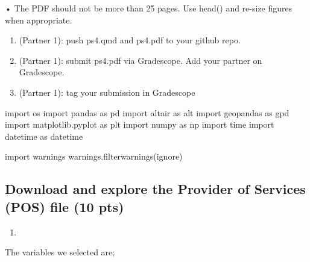 \documentclass[
  letterpaper,
  DIV=11,
  numbers=noendperiod]{scrartcl}
\newenvironment{Shaded}{\begin{snugshade}}{\end{snugshade}}
\newcommand{\ImportTok}[1]{\textcolor[rgb]{0.00,0.46,0.62}{#1}}
\newcommand{\NormalTok}[1]{\textcolor[rgb]{0.00,0.23,0.31}{#1}}
\newcommand{\StringTok}[1]{\textcolor[rgb]{0.13,0.47,0.30}{#1}}
\providecommand{\tightlist}{%
  \setlength{\itemsep}{0pt}\setlength{\parskip}{0pt}}\usepackage{longtable,booktabs,array}
\begin{document}
• The PDF should not be more than 25 pages. Use head() and re-size
figures when appropriate.

\begin{enumerate}
\def\labelenumi{\arabic{enumi}.}
\setcounter{enumi}{7}
\item
  (Partner 1): push ps4.qmd and ps4.pdf to your github repo.
\item
  (Partner 1): submit ps4.pdf via Gradescope. Add your partner on
  Gradescope.
\item
  (Partner 1): tag your submission in Gradescope
\end{enumerate}

\begin{Shaded}
\begin{Highlighting}[]
\ImportTok{import}\NormalTok{ os}
\ImportTok{import}\NormalTok{ pandas }\ImportTok{as}\NormalTok{ pd}
\ImportTok{import}\NormalTok{ altair }\ImportTok{as}\NormalTok{ alt}
\ImportTok{import}\NormalTok{ geopandas }\ImportTok{as}\NormalTok{ gpd}
\ImportTok{import}\NormalTok{ matplotlib.pyplot }\ImportTok{as}\NormalTok{ plt}
\ImportTok{import}\NormalTok{ numpy }\ImportTok{as}\NormalTok{ np}
\ImportTok{import}\NormalTok{ time}
\ImportTok{import}\NormalTok{ datetime }\ImportTok{as}\NormalTok{ datetime}

\ImportTok{import}\NormalTok{ warnings}
\NormalTok{warnings.filterwarnings(}\StringTok{\textquotesingle{}ignore\textquotesingle{}}\NormalTok{)}
\end{Highlighting}
\end{Shaded}

\subsection{Download and explore the Provider of Services (POS) file (10
pts)}\label{download-and-explore-the-provider-of-services-pos-file-10-pts}

\begin{enumerate}
\def\labelenumi{\arabic{enumi}.}
\tightlist
\item
\end{enumerate}

The variables we selected are;
\end{document}
